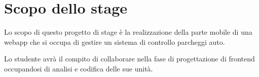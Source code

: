\section*{Scopo dello stage}
Lo scopo di questo progetto di stage è la realizzazione della parte mobile di una webapp che si occupa di 
gestire un sistema di controllo parcheggi auto.

Lo studente avrà il compito di collaborare nella fase di progettazione di frontend occupandosi di analisi 
e codifica delle sue unità.